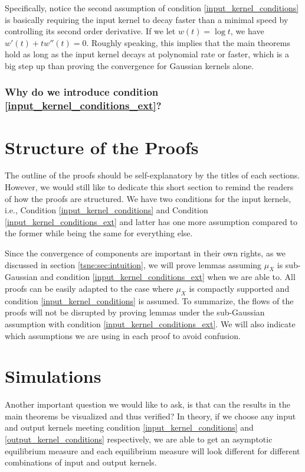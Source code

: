 Specifically, notice the second assumption of condition
\ref{input_kernel_conditions} is basically requiring the input kernel to decay
faster than a minimal speed by controlling its second order derivative. If we
let $w(t) = \log t$, we have $w'(t)+tw''(t) = 0$. Roughly speaking, this
implies that the main theorems hold as long as the input kernel decays at
polynomial rate or faster, which is a big step up than proving the convergence
for Gaussian kernels alone.

\subsubsection*{Why do we introduce condition \ref{input_kernel_conditions_ext}?}
\section{Structure of the Proofs} \label{tsne:sec:proof_structure}

The outline of the proofs should be self-explanatory by the titles of each
sections. However, we would still like to dedicate this short section to remind
the readers of how the proofs are structured. We have two conditions for the
input kernels, i.e., Condition \ref{input_kernel_conditions} and Condition
\ref{input_kernel_conditions_ext} and latter has one more assumption compared
to the former while being the same for everything else.

Since the convergence of components are important in their own rights, as we
discussed in section \ref{tsne:sec:intuition}, we will prove lemmas assuming
$\mu_X$ is sub-Gaussian and condition \ref{input_kernel_conditions_ext} when we
are able to. All proofs can be easily adapted to the case where $\mu_X$ is
compactly supported and condition \ref{input_kernel_conditions} is assumed. To
summarize, the flows of the proofs will not be disrupted by proving lemmas
under the sub-Gaussian assumption with condition
\ref{input_kernel_conditions_ext}. We will also indicate which assumptions we
are using in each proof to avoid confusion.

\section{Simulations}
Another important question we would like to ask, is that can the results in the main theorems be visualized and thus verified? In theory, if we choose any input and output kernels meeting condition \ref{input_kernel_conditions} and \ref{output_kernel_conditions} respectively, we are able to get an asymptotic equilibrium measure and each equilibrium measure will look different for different combinations of input and output kernels.

